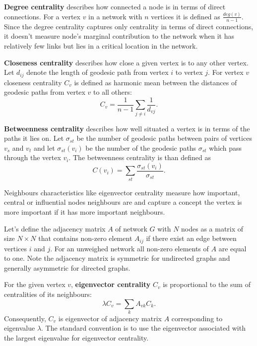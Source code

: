 \documentclass[times, utf8, diplomski]{fer}
\begin{document}
\textbf{Degree centrality} describes how connected a node is in terms of direct connections. For a vertex $v$ in a network with $n$ vertices it is defined as $\frac{deg(v)}{n - 1}$. Since the degree centrality captures only centrality in terms of direct connections, it doesn't measure node's marginal contribution to the network when it has relatively few links  but lies in a critical location in the network. 

\textbf{Closeness centrality} describes how close a given vertex is to any other vertex.  Let $d_{ij}$ denote the length of geodesic path from vertex $i$ to vertex $j$. 
For  vertex $v$ closeness centrality $C_v$ is defined as harmonic mean between the distances of geodesic paths from vertex $v$ to all others:
\begin{equation}
C_v = \frac{1}{n - 1} \sum_{j \neq i} \frac{1}{d_{vj}}. 
\end{equation}

\textbf{Betweenness centrality} describes how well situated a vertex is in terms of the paths it lies on. Let $\sigma_{st}$ be the number of geodesic paths between pairs of vertices $v_s$ and $v_t$ and let $\sigma_{st}(v_i)$ be the number of the geodesic paths $\sigma_{st}$  which pass through the vertex $v_i$. The betweenness centrality is than defined as 
\begin{equation}
C(v_i) = \sum_{st} \frac{\sigma_{st}(v_i)}{\sigma_{st}}.
\end{equation}

Neighbours characteristics like  eigenvector centrality measure how important, central or influential nodes neighbours are and  capture a concept the vertex is more important if it has more important neighbours.  

Let's define the adjacency matrix $A$ of network $G$ with $N$ nodes as a matrix of size $N \times N$ that contains non-zero element $A_{ij}$ if there exist an edge between vertices $i$ and $j$. For an unweighed network all non-zero elements of $A$ are equal to one.  Note the adjacency matrix is symmetric for undirected graphs and generally asymmetric for  directed graphs. 

For the given vertex $v$,  \textbf{ eigenvector centrality } $C_v$ \cite{bonacich1987power} is proportional to the sum of  centralities of its neighbours: 
\begin{equation}
\lambda C_v = \sum_{k} A_{vk} C_k.
\end{equation}
 Consequently, $C_v$ is eigenvector of adjacency matrix $A$ corresponding to eigenvalue $\lambda$.  The standard convention is to use the eigenvector associated with the largest eigenvalue for eigenvector centrality. 
\end{document}
